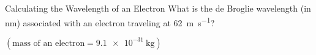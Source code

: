 \documentclass[handout,notes=hide]{beamer}
\begin{document}
\begin{frame}[t]{Calculating the Wavelength of an Electron}
	What is the de Broglie wavelength (in \si{\nano\meter}) associated with
	an electron traveling at \SI{62}{\meter\per\second}?

	$(\text{mass of an electron} = \SI{9.1e-31}{\kilo\gram})$



\end{frame}
\end{document}
